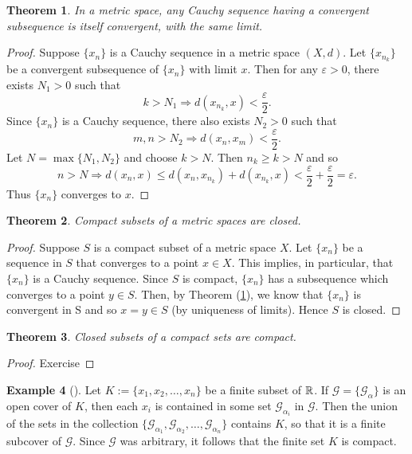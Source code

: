 \documentclass[	DIV=calc,paper=a4,fontsize=11pt]{scrartcl}	 	%
\newtheorem{thm}{Theorem}[section]
\theoremstyle{definition}
\newtheorem{exmp}[thm]{Example}
\theoremstyle{plain}
\theoremstyle{remark}
\begin{document}
\begin{thm}\label{subslimuniq}
In a metric space, any Cauchy sequence having a convergent subsequence is itself convergent, with the same limit.
\end{thm}
\begin{proof}
Suppose $\{x_n\}$ is a Cauchy sequence in a metric space $(X, d)$. Let $\{x_{n_k}\}$ be a convergent subsequence of $\{x_n\}$ with limit $x$. Then for any $\varepsilon> 0$, there exists $N_1 > 0$ such that
\[k > N_1\Rightarrow d(x_{n_k}, x) <\frac{\varepsilon}{2}.\]
Since $\{x_n\}$ is a Cauchy sequence, there also exists $N_2 > 0$ such that
\[m, n > N_2\Rightarrow d(x_n, x_m) <\frac{\varepsilon}{2}.\]
Let $N = \max\{N_1, N_2\}$ and choose $k > N$. Then $n_k \ge k > N$ and so
\[n > N\Rightarrow d(x_n, x)\le d(x_n, x_{n_k}) + d(x_{n_k}, x) < \frac{\varepsilon}{2}+\frac{\varepsilon}{2}=\varepsilon.\]
Thus $\{x_n\}$ converges to $x$.
\end{proof}

\begin{thm}
Compact subsets of a metric spaces are closed.
\end{thm}
\begin{proof}
Suppose $S$ is a compact subset of a metric space $X$. Let $\{x_n\}$ be a sequence in $S$ that converges to a point $x\in X$. This implies, in particular, that $\{x_n\}$ is a Cauchy sequence. Since $S$ is compact, $\{x_n\}$ has a subsequence which converges to a point $y\in S$. Then, by Theorem (\ref{subslimuniq}), we know that $\{x_n\}$ is convergent in S and so $x = y\in S$ (by uniqueness of limits). Hence $S$ is closed.
\end{proof}

\begin{thm}
Closed subsets of a compact sets are compact.
\end{thm}
\begin{proof}
Exercise
\end{proof}

\begin{exmp}[]
Let $K :=\{x_1,x_2,\ldots,x_n\}$ be a finite subset of $\Bbb R$. If $\mathcal{G}= \{\mathcal{G}_{\alpha}\}$ is an open cover of $K$, then each $x_i$ is contained in some set $\mathcal{G}_{\alpha_i}$ in $\mathcal{G}$. Then the union of the sets in the collection $\{\mathcal{G}_{\alpha_1},\mathcal{G}_{\alpha_2},\ldots, \mathcal{G}_{\alpha_n}\}$ contains $K$, so that it is a finite subcover of $\mathcal{G}$. Since $\mathcal{G}$ was arbitrary, it follows that the finite set $K$ is compact.
\end{exmp}
\end{document}

